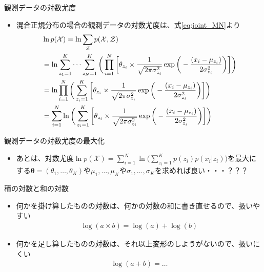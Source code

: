 \documentclass[aspectratio=169,unicode,dvipdfmx,14pt]{beamer}
\begin{document}
\begin{frame}{観測データの対数尤度}
\begin{itemize}
\item 混合正規分布の場合の観測データの対数尤度は、式\eqref{eq:joint_MN}より
\vspace{-.1in}
\begin{align}
& \ln p(\mathcal{X}) = \ln \sum_{\mathcal{Z}} p(\mathcal{X}, \mathcal{Z})
\notag \\ &
= \ln \sum_{z_1=1}^K \cdots \sum_{z_N=1}^K \bigg( \prod_{i=1}^N \bigg[ \theta_{z_i} \times \frac{1}{\sqrt{2\pi\sigma_{z_i}^2}}\exp\bigg( - \frac{(x_i - \mu_{z_i})}{2\sigma_{z_i}^2} \bigg) \bigg] \bigg)
\notag \\ &
= \ln \prod_{i=1}^N \bigg( \sum_{z_i=1}^K \bigg[ \theta_{z_i} \times \frac{1}{\sqrt{2\pi\sigma_{z_i}^2}}\exp\bigg( - \frac{(x_i - \mu_{z_i})}{2\sigma_{z_i}^2} \bigg) \bigg] \bigg)
\notag \\ &
= \sum_{i=1}^N \ln \bigg( \sum_{z_i=1}^K \bigg[ \theta_{z_i} \times \frac{1}{\sqrt{2\pi\sigma_{z_i}^2}}\exp\bigg( - \frac{(x_i - \mu_{z_i})}{2\sigma_{z_i}^2} \bigg) \bigg] \bigg)
\end{align}
\end{itemize}
\end{frame}

\begin{frame}{観測データの対数尤度の最大化}
\begin{itemize}
\item あとは、対数尤度$\ln p(\mathcal{X}) = \sum_{i=1}^N \ln \Big( \sum_{z_i=1}^K p(z_i) p(x_i | z_i) \Big)$を最大にする$\bm{\theta}=(\theta_1,\ldots,\theta_K)$や$\mu_1,\ldots,\mu_K$や$\sigma_1,\ldots,\sigma_K$を求めれば良い・・・？？？
\end{itemize}
\end{frame}


\begin{frame}{積の対数と和の対数}
\begin{itemize}
\item 何かを掛け算したものの対数は、何かの対数の和に書き直せるので、扱いやすい
\begin{align}
\log(a \times b) = \log(a) + \log(b)
\end{align}
\item 何かを足し算したものの対数は、それ以上変形のしようがないので、扱いにくい
\begin{align}
\log(a + b) = \ldots
\end{align}\end{itemize}
\end{frame}
\end{document}

